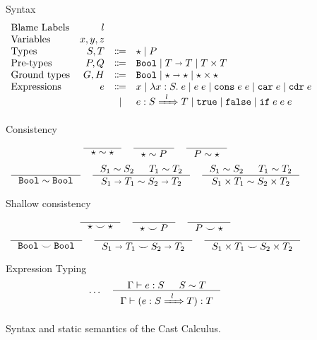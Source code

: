 \documentclass[runningheads]{llncs}
\newcommand{\infr}[2]{\inference{#1}{#2}}
\newcommand{\stxrule}[3]{\text{#2} & #1 & \Coloneqq & #3\\}
\newcommand{\stxrulecont}[1]{& & | & #1 \\}
\newcommand{\Tdyn}[0]{\ensuremath{\star}}
\newcommand{\Pbool}[0]{\ensuremath{\mathtt{Bool}}}
\newcommand{\Pfunc}[2]{\ensuremath{#1 \shortrightarrow #2}}
\newcommand{\Pprod}[2]{\ensuremath{#1 \times #2}}
\newcommand{\Gbool}[0]{\Pbool}
\newcommand{\Gfunc}[0]{\Pfunc{\Tdyn}{\Tdyn}}
\newcommand{\Gprod}[0]{\Pprod{\Tdyn}{\Tdyn}}
\newcommand{\evar}[1]{#1}
\newcommand{\elam}[3]{\lambda#1:#2.\;#3}
\newcommand{\eapp}[2]{#1\;#2}
\newcommand{\etrue}[0]{\mathtt{true}}
\newcommand{\efalse}[0]{\mathtt{false}}
\newcommand{\eif}[3]{\mathtt{if}\;#1\;#2\;#3}
\newcommand{\econs}[2]{\mathtt{cons} \; #1 \; #2}
\newcommand{\ecar}[1]{\mathtt{car} \; #1}
\newcommand{\ecdr}[1]{\mathtt{cdr} \; #1}
\newcommand{\ecast}[2]{\ensuremath{#1 : #2}}
\newcommand{\ccast}[3]{#1 \xRightarrow[]{\enskip #2 \enskip} #3}
\newcommand{\consistent}[2]{\ensuremath{#1\sim#2}}
\newcommand{\shallowlyconsistent}[2]{\ensuremath{#1\smile#2}}
\newcommand{\expressiontyping}[3]{\ensuremath{#1 \vdash #2 : #3}}
\begin{document}
\begin{figure}
Syntax
\[
\begin{array}{lrcl}
\text{Blame Labels} & l \\
\text{Variables} & x,y,z \\
\stxrule{S,T}{Types}{
	\Tdyn \mid{}
	P
}
\stxrule{P,Q}{Pre-types}{
	\Pbool \mid
	\Pfunc{T}{T} \mid
	\Pprod{T}{T}
}
\stxrule{G,H}{Ground types}{
	\Gbool  \mid
	\Gfunc  \mid
	\Gprod
}
\stxrule{e}{Expressions}{
	\evar{x}        \mid
	\elam{x}{S}{e}  \mid
	\eapp{e}{e}     \mid
	\econs{e}{e}  \mid
	\ecar{e}      \mid
	\ecdr{e}
}
\stxrulecont{
	\ecast{e}{\ccast{S}{l}{T}}  \mid
	\etrue         \mid
	\efalse        \mid
	\eif{e}{e}{e}
}
\end{array}
\]
	
	\fbox{\consistent{T}{T}} Consistency
	\begin{gather*}
	\infr{}{\consistent{\Tdyn}{\Tdyn}} \quad
	\infr{}{\consistent{\Tdyn}{P}    } \quad
	\infr{}{\consistent{P}{\Tdyn}    }
	\\[1ex]
	\infr{}{
		\consistent{\Pbool}{\Pbool}
	} \quad
	\infr{
		\consistent{S_1}{S_2} &
		\consistent{T_1}{T_2}
	}{
		\consistent{\Pfunc{S_1}{T_1}}{\Pfunc{S_2}{T_2}}
	} \quad
	\infr{
		\consistent{S_1}{S_2} &
		\consistent{T_1}{T_2}
	}{
		\consistent{\Pprod{S_1}{T_1}}{\Pprod{S_2}{T_2}}
	}
	\end{gather*}
		
	\fbox{\shallowlyconsistent{T}{T}} Shallow consistency
	\begin{gather*}
	\inference{}{
		\shallowlyconsistent{\Tdyn}{\Tdyn}
	} \quad
	\inference{}{
		\shallowlyconsistent{\Tdyn}{P}
	} \quad
	\inference{}{
		\shallowlyconsistent{P}{\Tdyn}
	} \\
	\inference{}{
		\shallowlyconsistent{\Pbool}{\Pbool}
	} \quad
	\inference{}{
		\shallowlyconsistent{\Pfunc{S_1}{T_1}}{\Pfunc{S_2}{T_2}}
	} \quad
	\inference{}{
		\shallowlyconsistent{\Pprod{S_1}{T_1}}{\Pprod{S_2}{T_2}}
	}
	\end{gather*}


\fbox{$\expressiontyping{\Gamma}{e}{T}$} Expression Typing
\begin{gather*}
\dots \quad
\infr{
	\expressiontyping{\Gamma}{e}{S}  &
	\consistent{S}{T}
}{
	\expressiontyping{\Gamma}{(\ecast{e}{\ccast{S}{l}{T}})}{T}
}
\end{gather*}

\caption{Syntax and static semantics of the Cast Calculus.}
\label{fig:statics}
\end{figure}
\end{document}
